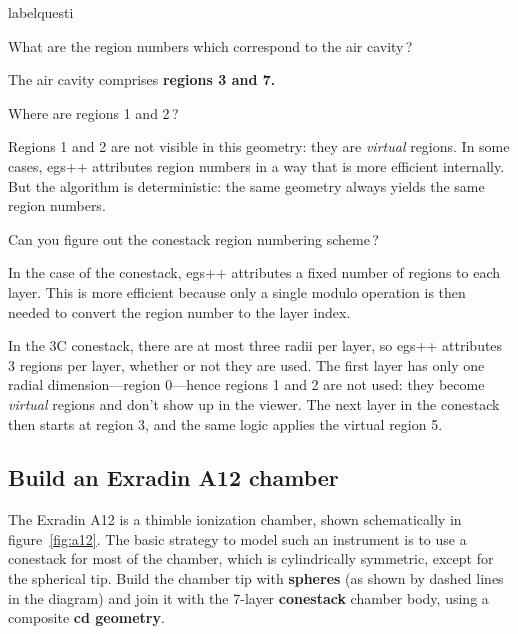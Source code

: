 \documentclass[12pt,twoside]{article}
\makeatletter
\renewcommand\thequesti         {\@arabic\c@questi}
\newenvironment{question}{
    \bfseries
    \edef\@questictr{questi}
    \expandafter
    \list \csname label\@questictr\endcsname {
        \usecounter\@questictr\def\makelabel##1{\hss\llap{##1}}
        \savebox{\questbox}             {\thequesti}
        \setlength\labelsep             {0.6em}
        \setlength\labelwidth           {\wd\questbox}
        \setlength\leftmargini          {\labelwidth}
        \addtolength{\leftmargini}      {\labelsep}
        \addtolength{\leftmargini}      {0.2em}
        \leftmargin\leftmargini
        \setlength\topsep               {1em}
        \setlength\itemsep              {1.2em}
        \setlength\parsep               {0.5em}
    }
}{\normalfont\endlist}
\newenvironment{answer}{\normalfont}{\relax}
\makeatother
\begin{document}
\begin{question}

\item What are the region numbers which correspond to the air cavity\,?

\begin{answer}
The air cavity comprises \textbf{regions 3 and 7.}
\end{answer}

\item Where are regions 1 and 2\,?

\begin{answer}
Regions 1 and 2 are not visible in this geometry: they are \textit{virtual}
regions. In some cases, egs++ attributes region numbers in a way that
is more efficient internally. But the algorithm is deterministic: the same
geometry always yields the same region numbers.
\end{answer}

\item Can you figure out the conestack region numbering scheme\,?

\begin{answer}
In the case of the conestack, egs++ attributes a fixed number of regions to
each layer. This is more efficient because only a single modulo operation is
then needed to convert the region number to the layer index.

In the 3C conestack, there are at most three radii per layer, so egs++
attributes 3 regions per layer, whether or not they are used. The first
layer has only one radial dimension---region 0---hence regions 1 and 2 are not
used: they become \textit{virtual} regions and don't show up in the viewer.
The next layer in the conestack then starts at region 3, and the same logic
applies the virtual region 5.
\end{answer}

\end{question}


\subsection{Build an Exradin A12 chamber}
The Exradin A12 is a thimble ionization chamber, shown schematically in
figure~\ref{fig:a12}. The basic strategy to model such an instrument is to use a
conestack for most of the chamber, which is cylindrically symmetric, except for
the spherical tip. Build the chamber tip with \textbf{spheres} (as shown by
dashed lines in the diagram) and join it with the 7-layer \textbf{conestack}
chamber body, using a composite \textbf{cd geometry}.
\end{document}
